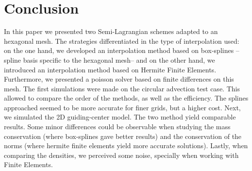 \documentclass[proc]{edpsmath}
\begin{document}
\section{Conclusion}
\label{sec:conclusion}
In this paper we presented two Semi-Lagrangian schemes adapted to an hexagonal mesh. The strategies differentiated in the type of interpolation used: on the one hand, we developed an interpolation method based on box-splines --spline basis specific to the hexagonal mesh-- and on the other hand, we introduced an interpolation method based on Hermite Finite Elements. Furthermore, we presented a poisson solver based on finite differences on this mesh. The first simulations were made on the circular advection test case. This allowed to compare the order of the methods, as well as the efficiency. The splines approached seemed to be more accurate for finer grids, but a higher cost. Next, we simulated the 2D guiding-center model. The two method yield comparable results. Some minor differences could be observable when studying the mass conservation (where box-splines gave better results) and the conservation of the norms (where hermite finite elements yield more accurate solutions). Lastly, when comparing the densities, we perceived some noise, specially when working with Finite Elements.


\newpage


\end{document}
